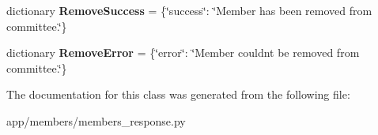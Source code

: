 \begin{DoxyCompactItemize}
\item 
\mbox{\label{classapp_1_1members_1_1members__response_1_1_response_a9e57f5705ad4ddbfc1145caf3423e714}} 
dictionary {\bfseries Remove\+Success} = \{\char`\"{}success\char`\"{}\+: \char`\"{}Member has been removed from committee.\char`\"{}\}
\item 
\mbox{\label{classapp_1_1members_1_1members__response_1_1_response_a2a0cbcd72072f0362d9ecff8b22baf8d}} 
dictionary {\bfseries Remove\+Error} = \{\char`\"{}error\char`\"{}\+: \char`\"{}Member couldn\textquotesingle{}t be removed from committee.\char`\"{}\}
\end{DoxyCompactItemize}


The documentation for this class was generated from the following file\+:\begin{DoxyCompactItemize}
\item 
app/members/members\+\_\+response.\+py\end{DoxyCompactItemize}
